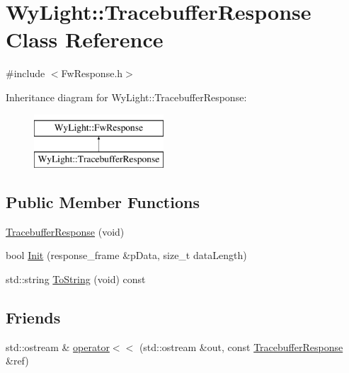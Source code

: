 \hypertarget{class_wy_light_1_1_tracebuffer_response}{\section{Wy\-Light\-:\-:Tracebuffer\-Response Class Reference}
\label{class_wy_light_1_1_tracebuffer_response}
}


{\ttfamily \#include $<$Fw\-Response.\-h$>$}

Inheritance diagram for Wy\-Light\-:\-:Tracebuffer\-Response\-:\begin{figure}[H]
\begin{center}
\leavevmode
\includegraphics[height=2.000000cm]{class_wy_light_1_1_tracebuffer_response}
\end{center}
\end{figure}
\subsection*{Public Member Functions}
\begin{DoxyCompactItemize}
\item 
\hyperlink{class_wy_light_1_1_tracebuffer_response_ab8a2cdb129467f1fd155bfd9774b4e56}{Tracebuffer\-Response} (void)
\item 
bool \hyperlink{class_wy_light_1_1_tracebuffer_response_a07ea006c8b97ff7b2a6e3b2de6dbd45f}{Init} (response\-\_\-frame \&p\-Data, size\-\_\-t data\-Length)
\item 
std\-::string \hyperlink{class_wy_light_1_1_tracebuffer_response_a5fd5d2e19b21070606da3d5be3647665}{To\-String} (void) const 
\end{DoxyCompactItemize}
\subsection*{Friends}
\begin{DoxyCompactItemize}
\item 
std\-::ostream \& \hyperlink{class_wy_light_1_1_tracebuffer_response_a4ada06f1b6fe35635b6efdbbea164fd8}{operator$<$$<$} (std\-::ostream \&out, const \hyperlink{class_wy_light_1_1_tracebuffer_response}{Tracebuffer\-Response} \&ref)
\end{DoxyCompactItemize}


